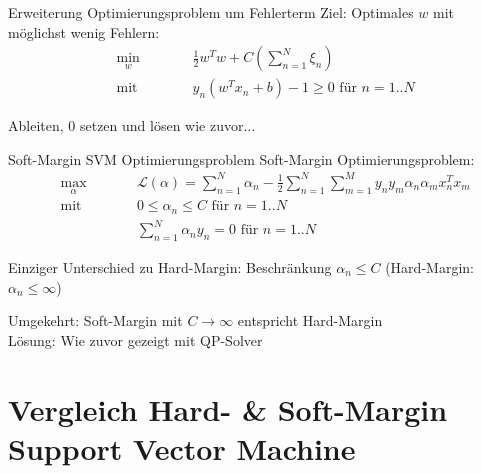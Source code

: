 \documentclass[ngerman]{beamer}
\newcommand{\Lagr}{\mathcal{L}}
\begin{document}
\begin{frame}{Erweiterung Optimierungsproblem um Fehlerterm}
	Ziel: Optimales $w$ mit möglichst wenig Fehlern:
	\begin{subequations}
		\begin{alignat*}{2}
			&\!\min_{w}        &\qquad&  \frac{1}{2} w^{T} w + C(\sum_{n=1}^{N} \xi_{n})\\
			&\text{mit } &      & y_n (w^{T} x_{n} + b)-1 \geq 0 \text{ für } n=1..N
		\end{alignat*}
	\end{subequations}

	Ableiten, $0$ setzen und lösen wie zuvor... \\
	
\end{frame}

\begin{frame}{Soft-Margin SVM Optimierungsproblem}
	Soft-Margin Optimierungsproblem:
	\begin{subequations}
		\begin{alignat*}{2}
			&\!\max_{\alpha}        &\qquad&  	\Lagr(\alpha) = \sum_{n=1}^{N} \alpha_{n} - \frac{1}{2} \sum_{n=1}^{N} \sum_{m=1}^{M} y_{n} y_{m} \alpha_{n} \alpha_{m} x_{n}^{T} x_{m} \\
			&\text{mit } &      & 0 \leq \alpha_{n} \leq C \text{ für } n=1..N\\
			&       & & \sum_{n=1}^{N} \alpha_{n} y_{n} = 0\text{ für } n=1..N
		\end{alignat*}
	\end{subequations}

	Einziger Unterschied zu Hard-Margin: Beschränkung $\alpha_{n} \leq C$ (Hard-Margin: $\alpha_{n} \leq \infty$)\\
	
	\pause
	
	Umgekehrt: Soft-Margin mit $C \rightarrow \infty$ entspricht Hard-Margin \\

	Lösung: Wie zuvor gezeigt mit QP-Solver
\end{frame}



\section{Vergleich Hard- \& Soft-Margin Support Vector Machine}
\end{document}
